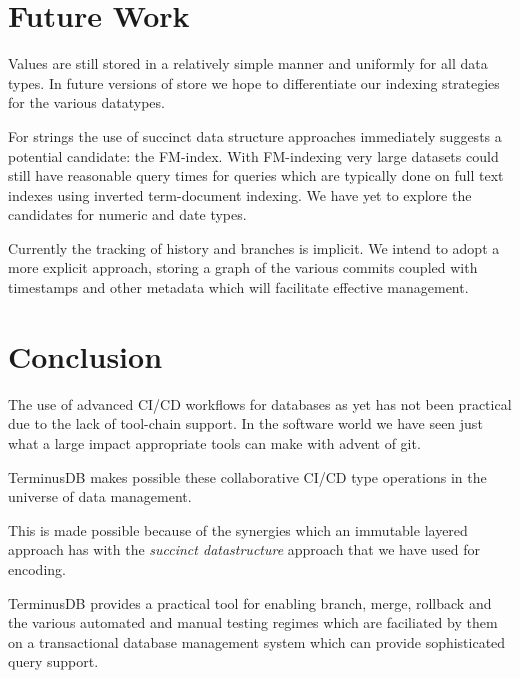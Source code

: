 \documentclass[10pt, a4paper, twocolumn]{article} %
\begin{document}
\section{Future Work}

Values are still stored in a relatively simple manner and uniformly
for all data types. In future versions of store we hope to
differentiate our indexing strategies for the various datatypes.

For strings the use of succinct data structure approaches immediately
suggests a potential candidate: the FM-index. With FM-indexing very
large datasets could still have reasonable query times for queries
which are typically done on full text indexes using inverted
term-document indexing. We have yet to explore the candidates for
numeric and date types.

Currently the tracking of history and branches is implicit. We intend
to adopt a more explicit approach, storing a graph of the various
commits coupled with timestamps and other metadata which will
facilitate effective management.

\section{Conclusion}

The use of advanced CI/CD workflows for databases as yet has not been
practical due to the lack of tool-chain support. In the software world
we have seen just what a large impact appropriate tools can make with
advent of git.

TerminusDB makes possible these collaborative CI/CD type operations in
the universe of data management.

This is made possible because of the synergies which an immutable
layered approach has with the {\em succinct datastructure} approach
that we have used for encoding.

TerminusDB provides a practical tool for enabling branch, merge,
rollback and the various automated and manual testing regimes which
are faciliated by them on a transactional database management system
which can provide sophisticated query support.

\printbibliography[title={Bibliography}]
\end{document}
